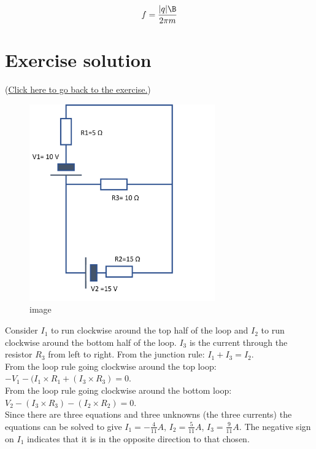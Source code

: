 \documentclass[
]{book}
\begin{document}
\[\label{eq:cycloF}
f = \frac{|q|\B}{2\pi m}\]

\hypertarget{Kirchoff_ExSol}{%
\section*{Exercise solution}\label{Kirchoff_ExSol}}

(\protect\hyperlink{Kirchoff_Ex}{Click here to go back to the exercise.})

\begin{figure}
\centering
\includegraphics[width=80mm,height=\textheight]{Figures/Kirchoff_Ex.png}
\caption{image}
\end{figure}

Consider \(I_1\) to run clockwise around the top half of the loop and
\(I_2\) to run clockwise around the bottom half of the loop. \(I_3\) is the
current through the resistor \(R_3\) from left to right. From the junction
rule: \(I_1 + I_3 = I_2\).\\
From the loop rule going clockwise around the top loop:
\(-V_1 - (I_1 \times R_1 + (I_3 \times R_3) = 0\).\\
From the loop rule going clockwise around the bottom loop:
\(V_2 - (I_3 \times R_3) - (I_2 \times R_2) = 0\).\\
Since there are three equations and three unknowns (the three currents)
the equations can be solved to give \(I_1=-\frac{4}{11} A\),
\(I_2 = \frac{5}{11} A\), \(I_3 = \frac{9}{11} A\). The negative sign on
\(I_1\) indicates that it is in the opposite direction to that chosen.

  
\end{document}
